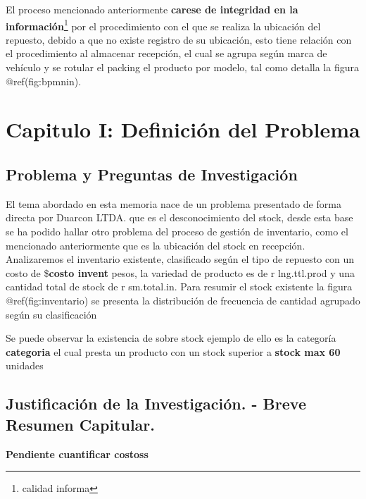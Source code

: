 \documentclass[
]{article}
\begin{document}
El proceso mencionado anteriormente \textbf{carese de integridad en la
información}\footnote{calidad informa} por el procedimiento con el que
se realiza la ubicación del repuesto, debido a que no existe registro de
su ubicación, esto tiene relación con el procedimiento al almacenar
recepción, el cual se agrupa según marca de vehículo y se rotular el
packing el producto por modelo, tal como detalla la figura
@ref(fig:bpmnin).

\hypertarget{capitulo-i-definiciuxf3n-del-problema}{%
\section{Capitulo I: Definición del
Problema}\label{capitulo-i-definiciuxf3n-del-problema}}

\hypertarget{problema-y-preguntas-de-investigaciuxf3n}{%
\subsection{Problema y Preguntas de
Investigación}\label{problema-y-preguntas-de-investigaciuxf3n}}

El tema abordado en esta memoria nace de un problema presentado de forma
directa por Duarcon LTDA. que es el desconocimiento del stock, desde
esta base se ha podido hallar otro problema del proceso de gestión de
inventario, como el mencionado anteriormente que es la ubicación del
stock en recepción. Analizaremos el inventario existente, clasificado
según el tipo de repuesto con un costo de \$\textbf{costo invent} pesos,
la variedad de producto es de r lng.ttl.prod y una cantidad total de
stock de r sm.total.in. Para resumir el stock existente la figura
@ref(fig:inventario) se presenta la distribución de frecuencia de
cantidad agrupado según su clasificación

Se puede observar la existencia de sobre stock ejemplo de ello es la
categoría \textbf{categoria} el cual presta un producto con un stock
superior a \textbf{stock max 60} unidades

\hypertarget{justificaciuxf3n-de-la-investigaciuxf3n.---breve-resumen-capitular.}{%
\subsection{Justificación de la Investigación. - Breve Resumen
Capitular.}\label{justificaciuxf3n-de-la-investigaciuxf3n.---breve-resumen-capitular.}}

\textbf{Pendiente cuantificar costoss }
\end{document}
